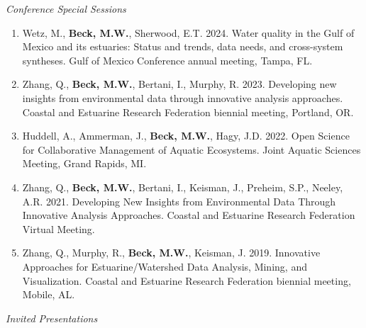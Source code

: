 \documentclass[letterpaper,12pt]{article}
\begin{document}
\vspace{\baselineskip} 
\centerline{\large{\textit{Conference Special Sessions}}}

\begin{enumerate}

\item Wetz, M., {\bf Beck, M.W.}, Sherwood, E.T. 2024. Water quality in the Gulf of Mexico and its estuaries: Status and trends, data needs, and cross-system syntheses. Gulf of Mexico Conference annual meeting, Tampa, FL.

\item Zhang, Q., {\bf Beck, M.W.}, Bertani, I., Murphy, R. 2023. Developing new insights from environmental data through innovative analysis approaches. Coastal and Estuarine Research Federation biennial meeting, Portland, OR.

\item Huddell, A., Ammerman, J., {\bf Beck, M.W.}, Hagy, J.D. 2022. Open Science for Collaborative Management of Aquatic Ecosystems. Joint Aquatic Sciences Meeting, Grand Rapids, MI. 

\item Zhang, Q., {\bf Beck, M.W.}, Bertani, I., Keisman, J., Preheim, S.P., Neeley, A.R. 2021. Developing New Insights from Environmental Data Through Innovative Analysis Approaches. Coastal and Estuarine Research Federation Virtual Meeting.

\item Zhang, Q., Murphy, R., {\bf Beck, M.W.}, Keisman, J. 2019. Innovative Approaches for Estuarine/Watershed Data Analysis, Mining, and Visualization. Coastal and Estuarine Research Federation biennial meeting, Mobile, AL.

\end{enumerate}

\vspace{\baselineskip} 
\centerline{\large{\textit{Invited Presentations}}}
\end{document}
